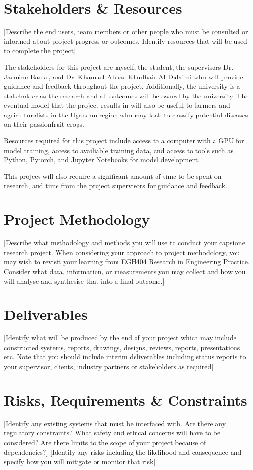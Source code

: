 \documentclass[11pt]{article}
\begin{document}
\section{Stakeholders \& Resources}
[Describe the end users, team members or other people who must be consulted or informed about
project progress or outcomes. Identify resources that will be used to complete the project]

The stakeholders for this project are myself, the student, the supervisors Dr. Jasmine Banks, 
and Dr. Khamael Abbas Khudhair Al-Dulaimi who will provide guidance and feedback
throughout the project. Additionally, the university is a stakeholder as the research
and all outcomes will be owned by the university. The eventual model that the project
results in will also be useful to farmers and agriculturalists in the Ugandan 
region who may look to classify potential diseases on their passionfruit crops.

Resources required for this project include access to a computer with a GPU for 
model training, access to availiable training data, and access to tools such as 
Python, Pytorch, and Jupyter Notebooks for model development.

This project will also require a significant amount of time to be spent on research,
and time from the project supervisors for guidance and feedback.


\section{Project Methodology}
[Describe what methodology and methods you will use to conduct your capstone research project.
When considering your approach to project methodology, you may wish to revisit your learning from
EGH404 Research in Engineering Practice. Consider what data, information, or measurements you
may collect and how you will analyse and synthesise that into a final outcome.]

\section{Deliverables}
[Identify what will be produced by the end of your project which may include constructed systems,
reports, drawings, designs, reviews, reports, presentations etc. Note that you should include interim
deliverables including status reports to your supervisor, clients, industry partners or stakeholders as
required]

\section{Risks, Requirements \& Constraints}
[Identify any existing systems that must be interfaced with. Are there any regulatory constraints?
What safety and ethical concerns will have to be considered? Are there limits to the scope of your
project because of dependencies?]
[Identify any risks including the likelihood and consequence and specify how you will mitigate or
monitor that risk]
\end{document}
